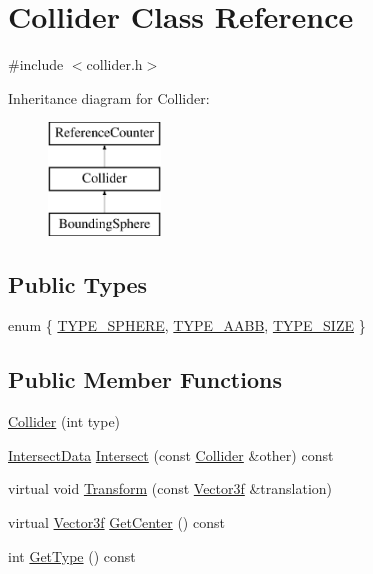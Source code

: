 \hypertarget{class_collider}{}\section{Collider Class Reference}
\label{class_collider}


{\ttfamily \#include $<$collider.\+h$>$}

Inheritance diagram for Collider\+:\begin{figure}[H]
\begin{center}
\leavevmode
\includegraphics[height=3.000000cm]{class_collider}
\end{center}
\end{figure}
\subsection*{Public Types}
\begin{DoxyCompactItemize}
\item 
enum \{ \hyperlink{class_collider_a63b6ff66c4e92905d981551006239987aedae9a0a3179b58ac15c0616035042e2}{T\+Y\+P\+E\+\_\+\+S\+P\+H\+E\+R\+E}, 
\hyperlink{class_collider_a63b6ff66c4e92905d981551006239987a77aeb0be239c46a6adbf47df8eb3123c}{T\+Y\+P\+E\+\_\+\+A\+A\+B\+B}, 
\hyperlink{class_collider_a63b6ff66c4e92905d981551006239987ae839bd8ef09a93bd5b4bcb8c6cec9251}{T\+Y\+P\+E\+\_\+\+S\+I\+Z\+E}
 \}
\end{DoxyCompactItemize}
\subsection*{Public Member Functions}
\begin{DoxyCompactItemize}
\item 
\hyperlink{class_collider_a3fed523e82fb51e73bf97c7690163afe}{Collider} (int type)
\item 
\hyperlink{class_intersect_data}{Intersect\+Data} \hyperlink{class_collider_a3d2665cd1c5e8142c9c960cc68316e92}{Intersect} (const \hyperlink{class_collider}{Collider} \&other) const 
\item 
virtual void \hyperlink{class_collider_af15ebbef03988c4c0dffdf1fa65eb72f}{Transform} (const \hyperlink{class_vector3f}{Vector3f} \&translation)
\item 
virtual \hyperlink{class_vector3f}{Vector3f} \hyperlink{class_collider_ae707f012a5f8263d5262897b4a3d9ee5}{Get\+Center} () const 
\item 
int \hyperlink{class_collider_a3c68244a12cd4f973e5d4eeaad599a32}{Get\+Type} () const 
\end{DoxyCompactItemize}


